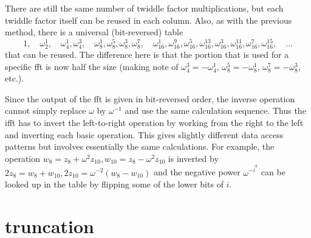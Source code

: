 \documentclass[12 pt]{amsart}
\newcommand{\om}[2] {\omega_{#1}^{#2}}
\begin{document}
There are still the same number of twiddle factor multiplications, but each twiddle factor
itself can be reused in each column. Also, as with the previous method, there is a
universal (bit-reversed) table
\begin{equation*}
1,
\quad \om{2}{1},
\quad \om{4}{1}, \om{4}{3},
\quad \om{8}{1},\om{8}{5},\om{8}{3},\om{8}{7},
\quad \om{16}{1},\om{16}{9},\om{16}{5},\om{16}{13},\om{16}{3},\om{16}{11},\om{16}{7},\om{16}{15},
\quad \dots
\end{equation*}
that can be reused. The difference here is that the portion that is used for a specific fft
is now half the size (making note of
$\om{4}{3} = -\om{4}{1}$, $\om{8}{5} = -\om{8}{1}$, $\om{8}{7} = -\om{8}{3}$, etc.).

Since the output of the fft is given in bit-reversed order, the inverse operation cannot
simply replace $\omega$ by $\omega^{-1}$ and use the same calculation sequence. Thus the ifft
has to invert the left-to-right operation by working from the right to the left and inverting
each basic operation. This gives slightly different data access patterns but involves
essentially the same calculations. For example, the operation
$w_8 = z_8 + \omega^2 z_{10}\text{,} \, w_{10} = z_8 - \omega^2 z_{10}$ is inverted by
$2 z_8 = w_8 + w_{10}\text{,} \, 2 z_{10} = \omega^{-2}(w_8 - w_{10})$ and the negative
power $\omega^{-\overline{i}^k}$ can be looked up in the table by flipping some of the
lower bits of $i$.

\section{truncation}
\end{document}
